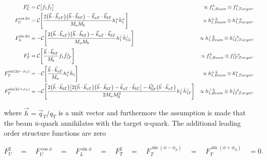 \begin{align}
  F_{U}^{1} &  =  
  {\cal C}  \big[ f_{1}  \bar{f}_{1} \big]
  &\propto f^{\bar{u}}_{1,Beam} \otimes f^u_{1,Target}, \\
  F_{U}^{\cos 2\phi} &  =  
  {\cal C}  \Bigg[ \frac{2\big( \vec{h} \cdot \vec{k}_{aT} \big) 
                          \big( \vec{h} \cdot \vec{k}_{bT} \big)
                         - \vec{k}_{aT} \cdot \vec{k}_{bT}} {M_{a} M_{b}}  
    h_{1}^{\perp}  \bar{h}_{1}^{\perp} \Bigg]
  &\propto h^{\perp \, \bar{u}}_{1,Beam} \otimes h^{\perp \, u}_{1,Target}, \\
F_{L}^{\sin 2\phi} &  =  
-  {\cal C}  \Bigg[ \frac{2\big( \vec{h} \cdot \vec{k}_{aT} \big) 
                          \big( \vec{h} \cdot \vec{k}_{bT} \big)
                         - \vec{k}_{aT} \cdot \vec{k}_{bT}} {M_{a} M_{b}}  
                  h_{1}^{\perp}  \bar{h}_{1L}^{\perp} \Bigg]
&\propto h^{\perp \, \bar{u}}_{1,Beam} \otimes h^{\perp \, u}_{1L,Target}, \\
F_{T}^{1} &  =   
{\cal C}  \Bigg[ \frac{\vec{h} \cdot \vec{k}_{bT}} {M_{b}}  
  f_{1}  \bar{f}_{1T}^{\perp} \Bigg]
&\propto f^{\bar{u}}_{1,Beam} \otimes f^{\perp \, u}_{1T,Target}, \\
F_{T}^{\sin (2\phi - \phi_S)} &  =  
-  {\cal C}  \Bigg[ \frac{\vec{h} \cdot \vec{k}_{aT}} {M_{a}} 
  h_{1}^{\perp}  \bar{h}_{1} \Bigg]
&\propto h^{\perp \, \bar{u}}_{1,Beam} \otimes h^{u}_{1,Target}, \\
F_{T}^{\sin (2\phi + \phi_S)} &  =  
-  {\cal C}  \Bigg[ \frac{2\big( \vec{h} \cdot \vec{k}_{bT} \big)
                    \big[2 \big( \vec{h} \cdot\vec{k}_{aT} \big)
                         \big( \vec{h} \cdot \vec{k}_{bT} \big)
                        -\vec{k}_{aT} \cdot \vec{k}_{bT} \big]
                   - \vec{k}_{bT}^{2} \big( \vec{h} \cdot \vec{k}_{aT} \big)}
                  {2 M_{a} M_{b}^{2}}  
                  h_{1}^{\perp}  \bar{h}_{1T}^{\perp} \Bigg]
&\propto h^{\perp \, \bar{u}}_{1,Beam} \otimes h^{\perp \, u}_{1T,Target},
\end{align}

\noindent
where $\vec{h} = \vec{q}_T/q_T$ is a unit vector and furthermore the assumption
is made that the beam $\bar{u}$-quark annihilates with the target u-quark.  The
additional leading order structure functions are zero

\begin{equation}
  F_{U}^{2} \quad = \quad F_{U}^{\cos\phi} \quad = \quad F_{L}^{\sin\phi} \quad
  = \quad F_{T}^{2} \quad = \quad F_{T}^{\sin(\phi - \phi_S)} \quad = \quad
  F_{T}^{\sin(\phi + \phi_S)} \quad = 0.
\end{equation}

